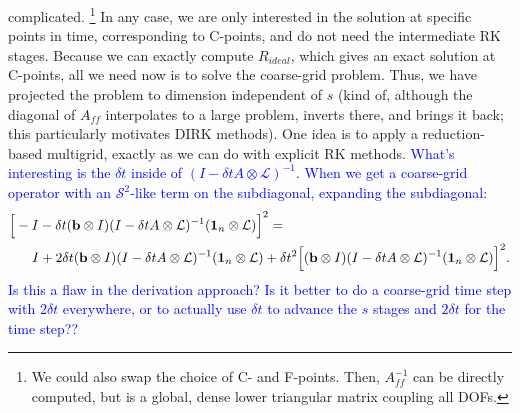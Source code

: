 \documentclass[a4paper,12pt]{article}
\newcommand{\tcb}{\textcolor{blue}}
\begin{document}
complicated. \footnote{
We could also swap the choice of C- and F-points. Then, $A_{ff}^{-1}$ can be directly computed, but is a global, dense lower triangular
matrix coupling all DOFs.} In any case, we are only interested in the solution at specific points in time, corresponding to C-points, and
do not need the intermediate RK stages. Because we can exactly compute $R_{ideal}$, which gives an exact solution at C-points, all we
need now is to solve the coarse-grid problem. Thus, we have projected the problem to dimension independent of $s$ (kind of, although
the diagonal of $A_{ff}$ interpolates to a large problem, inverts there, and brings it back; this particularly motivates DIRK methods). 
One idea is to apply a reduction-based multigrid, exactly as we can do with explicit RK methods.
\tcb{What's interesting is the $\delta t$ inside of $(I - \delta tA\otimes\mathcal{L})^{-1}$.
When we get a coarse-grid operator with an $\mathcal{S}^2$-like term on the subdiagonal, expanding the subdiagonal:
%
\begin{align*}
&\Big[ -I - \delta t(\mathbf{b}\otimes I )(I - \delta tA\otimes \mathcal{L})^{-1}(\mathbf{1}_n \otimes \mathcal{L}) \Big]^2 =\\
	 & \hspace{4ex}I + 2\delta t (\mathbf{b}\otimes I )(I - \delta tA\otimes \mathcal{L})^{-1}(\mathbf{1}_n \otimes \mathcal{L}) + \delta t^2\Big[(\mathbf{b}\otimes I )(I - \delta tA\otimes \mathcal{L})^{-1}(\mathbf{1}_n \otimes \mathcal{L}) \Big]^2.
\end{align*}
%
Is this a flaw in the derivation approach? Is it better to do a coarse-grid time step with $2\delta t$ everywhere, or to actually use
$\delta t$ to advance the $s$ stages and $2\delta t$ for the time step??
}
\end{document}
